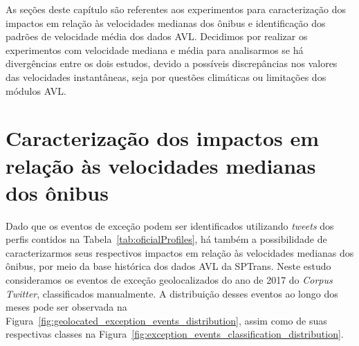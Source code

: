 \documentclass[
	12pt,				%
	oneside,			%
	a4paper,			%
	english,			%
	brazil				%
	]{abntex2ppgsi}
\begin{document}
{{{As seções deste capítulo são referentes aos experimentos para caracterização dos impactos em relação às velocidades medianas dos ônibus e identificação dos padrões de velocidade média dos dados AVL. Decidimos por realizar os experimentos com velocidade mediana e média para analisarmos se há divergências entre os dois estudos, devido a possíveis discrepâncias nos valores das velocidades instantâneas, seja por questões climáticas ou limitações dos módulos AVL.

\section{Caracterização dos impactos em relação às velocidades medianas dos ônibus}

Dado que os eventos de exceção podem ser identificados utilizando \textit{tweets} dos perfis contidos na Tabela~\ref{tab:oficialProfiles}, há também a possibilidade de caracterizarmos seus respectivos impactos em relação às velocidades medianas dos ônibus, por meio da base histórica dos dados AVL da SPTrans.  Neste estudo consideramos os eventos de exceção geolocalizados do ano de 2017 do \textit{Corpus Twitter}, classificados manualmente. A distribuição desses eventos ao longo dos meses pode ser observada  na Figura~\ref{fig:geolocated_exception_events_distribution}, assim como de suas respectivas classes na Figura~\ref{fig:exception_events_classification_distribution}.



}}}
\end{document}
